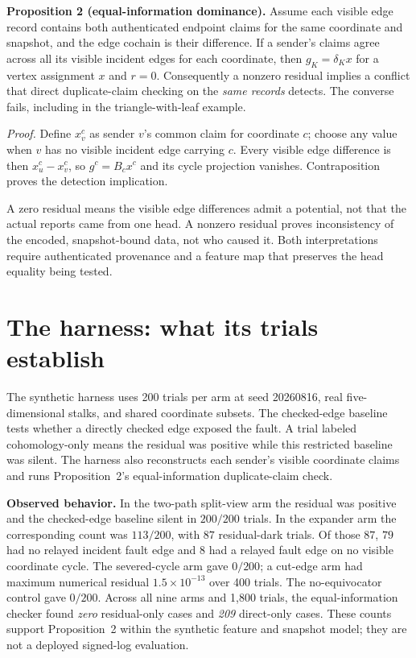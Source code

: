 \documentclass[11pt,a4paper]{article}
\begin{document}
\begin{thebox}
\textbf{Proposition 2 (equal-information dominance).} Assume each visible edge record contains both authenticated endpoint
claims for the same coordinate and snapshot, and the edge cochain is their difference. If a sender's claims agree across
all its visible incident edges for each coordinate, then $g_K=\delta_Kx$ for a vertex assignment $x$ and $r=0$.
Consequently a nonzero residual implies a conflict that direct duplicate-claim checking on the \emph{same records}
detects. The converse fails, including in the triangle-with-leaf example.

\emph{Proof.} Define $x_v^c$ as sender $v$'s common claim for coordinate $c$; choose any value when $v$ has no visible
incident edge carrying $c$. Every visible edge difference is then $x_u^c-x_v^c$, so $g^c=B_cx^c$ and its cycle
projection vanishes. Contraposition proves the detection implication.
\end{thebox}

\begin{boundary}
A zero residual means the visible edge differences admit a potential, not that the actual reports came from one head. A nonzero residual proves inconsistency of the encoded, snapshot-bound data, not who caused it. Both interpretations require authenticated provenance and a feature map that preserves the head equality being tested.
\end{boundary}

\section{The harness: what its trials establish}\label{sec:harness}

The synthetic harness uses 200 trials per arm at seed 20260816, real five-dimensional stalks, and shared coordinate
subsets. The checked-edge baseline tests whether a directly checked edge exposed the fault. A trial labeled
cohomology-only means the residual was positive while this restricted baseline was silent. The harness also
reconstructs each sender's visible coordinate claims and runs Proposition~2's equal-information duplicate-claim check.

\begin{thebox}
\textbf{Observed behavior.} In the two-path split-view arm the residual was positive and the checked-edge baseline silent
in $200/200$ trials. In the expander arm the corresponding count was $113/200$, with $87$ residual-dark trials. Of those
$87$, $79$ had no relayed incident fault edge and $8$ had a relayed fault edge on no visible coordinate cycle. The
severed-cycle arm gave $0/200$; a cut-edge arm had maximum numerical residual $1.5\times10^{-13}$ over 400 trials. The
no-equivocator control gave $0/200$. Across all nine arms and 1,800 trials, the equal-information checker found
\emph{zero} residual-only cases and \emph{209} direct-only cases. These counts support Proposition~2 within the
synthetic feature and snapshot model; they are not a deployed signed-log evaluation.
\end{thebox}
\end{document}
